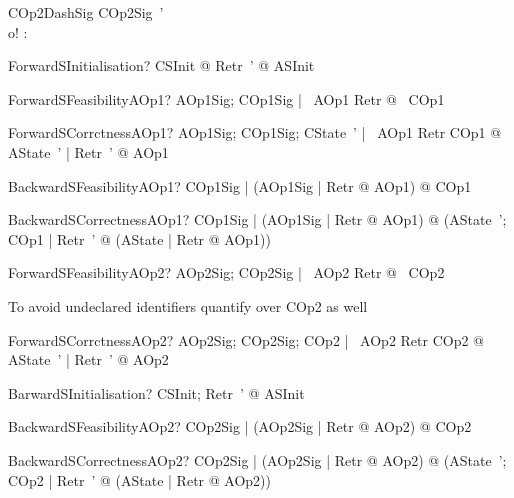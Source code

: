 \begin{schema}{COp2DashSig}
   COp2Sig~' \\
   o! : \nat
\end{schema}

\begin{theorem}{ForwardSInitialisation}\vdash? 
   \forall CSInit @ \exists Retr~' @ ASInit
\end{theorem}

\begin{theorem}{ForwardSFeasibilityAOp1}\vdash? 
   \forall AOp1Sig; COp1Sig | \pre~AOp1 \land Retr @ \pre~COp1
\end{theorem}

\begin{theorem}{ForwardSCorrctnessAOp1}\vdash? 
   \forall AOp1Sig; COp1Sig; CState~' | \pre~AOp1 \land Retr \land COp1 @ 
   	\exists AState~' | Retr~' @ AOp1
\end{theorem}

\begin{theorem}{BackwardSFeasibilityAOp1}\vdash? 
   \forall COp1Sig | (\forall AOp1Sig | Retr @ \pre AOp1) @ \pre COp1
\end{theorem}

\begin{theorem}{BackwardSCorrectnessAOp1}\vdash? 
  \forall COp1Sig | (\forall AOp1Sig | Retr @ \pre AOp1) @ 
   	(\forall AState~'; COp1 | Retr~' @ (\exists AState | Retr @ AOp1))
\end{theorem}


\begin{theorem}{ForwardSFeasibilityAOp2}\vdash? 
   \forall AOp2Sig; COp2Sig | \pre~AOp2 \land Retr @ \pre~COp2
\end{theorem}

To avoid undeclared identifiers quantify over COp2 as well
\begin{theorem}{ForwardSCorrctnessAOp2}\vdash? 
  \forall AOp2Sig; COp2Sig; COp2 | \pre~AOp2 \land Retr \land COp2 @ 
   	\exists AState~' | Retr~' @ AOp2
\end{theorem}

\begin{theorem}{BarwardSInitialisation}\vdash? 
   \forall CSInit; Retr~' @ ASInit 
\end{theorem}

\begin{theorem}{BackwardSFeasibilityAOp2}\vdash? 
   \forall COp2Sig | (\forall AOp2Sig | Retr @ \pre AOp2) @ \pre COp2
\end{theorem}

\begin{theorem}{BackwardSCorrectnessAOp2}\vdash? 
  \forall COp2Sig | (\forall AOp2Sig | Retr @ \pre AOp2) @ 
   	(\forall AState~'; COp2 | Retr~' @ (\exists AState | Retr @ AOp2))
\end{theorem}
